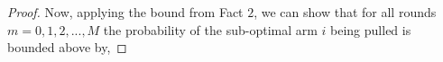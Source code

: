 \begin{proof}
%

Now, applying the bound from Fact $2$, we can show that for all rounds $m=0,1,2,...,M$ the probability of the sub-optimal arm $i$ being pulled is bounded above by,


\end{proof}
